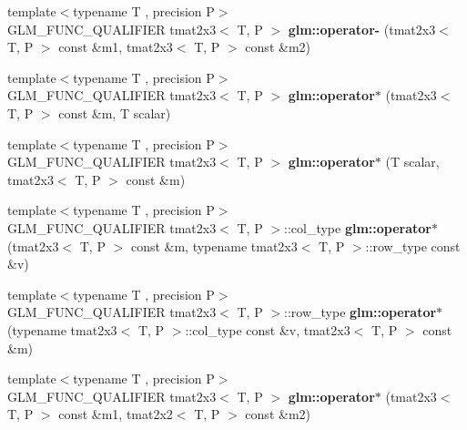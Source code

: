 \begin{DoxyCompactItemize}
\item 
\mbox{\label{type__mat2x3_8inl_a2a06e2f9118332e9be75b7d6e9b7810f}} 
{\footnotesize template$<$typename T , precision P$>$ }\\G\+L\+M\+\_\+\+F\+U\+N\+C\+\_\+\+Q\+U\+A\+L\+I\+F\+I\+ER tmat2x3$<$ T, P $>$ {\bfseries glm\+::operator-\/} (tmat2x3$<$ T, P $>$ const \&m1, tmat2x3$<$ T, P $>$ const \&m2)
\item 
\mbox{\label{type__mat2x3_8inl_ae07f713ae7e05d86d3c5a607d80c2afd}} 
{\footnotesize template$<$typename T , precision P$>$ }\\G\+L\+M\+\_\+\+F\+U\+N\+C\+\_\+\+Q\+U\+A\+L\+I\+F\+I\+ER tmat2x3$<$ T, P $>$ {\bfseries glm\+::operator$\ast$} (tmat2x3$<$ T, P $>$ const \&m, T scalar)
\item 
\mbox{\label{type__mat2x3_8inl_ae545438e1c3df7c306a303b57ed5cc3e}} 
{\footnotesize template$<$typename T , precision P$>$ }\\G\+L\+M\+\_\+\+F\+U\+N\+C\+\_\+\+Q\+U\+A\+L\+I\+F\+I\+ER tmat2x3$<$ T, P $>$ {\bfseries glm\+::operator$\ast$} (T scalar, tmat2x3$<$ T, P $>$ const \&m)
\item 
\mbox{\label{type__mat2x3_8inl_a949617aa8e8cff34aabb9149c9f456af}} 
{\footnotesize template$<$typename T , precision P$>$ }\\G\+L\+M\+\_\+\+F\+U\+N\+C\+\_\+\+Q\+U\+A\+L\+I\+F\+I\+ER tmat2x3$<$ T, P $>$\+::col\+\_\+type {\bfseries glm\+::operator$\ast$} (tmat2x3$<$ T, P $>$ const \&m, typename tmat2x3$<$ T, P $>$\+::row\+\_\+type const \&v)
\item 
\mbox{\label{type__mat2x3_8inl_a5286d44cdb2c44dafa52fae5b84655ea}} 
{\footnotesize template$<$typename T , precision P$>$ }\\G\+L\+M\+\_\+\+F\+U\+N\+C\+\_\+\+Q\+U\+A\+L\+I\+F\+I\+ER tmat2x3$<$ T, P $>$\+::row\+\_\+type {\bfseries glm\+::operator$\ast$} (typename tmat2x3$<$ T, P $>$\+::col\+\_\+type const \&v, tmat2x3$<$ T, P $>$ const \&m)
\item 
\mbox{\label{type__mat2x3_8inl_abf88e6226fe06c50efc4632326d0b5d6}} 
{\footnotesize template$<$typename T , precision P$>$ }\\G\+L\+M\+\_\+\+F\+U\+N\+C\+\_\+\+Q\+U\+A\+L\+I\+F\+I\+ER tmat2x3$<$ T, P $>$ {\bfseries glm\+::operator$\ast$} (tmat2x3$<$ T, P $>$ const \&m1, tmat2x2$<$ T, P $>$ const \&m2)

\end{DoxyCompactItemize}
